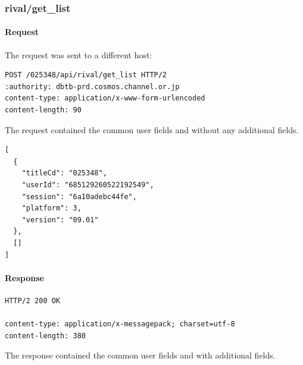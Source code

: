 

\subsubsection{rival/get\_list}
\label{subsec:api_rival_get_list}

\paragraph{Request}

The request was sent to a different host:

\begin{lstlisting}
POST /025348/api/rival/get_list HTTP/2
:authority: dbtb-prd.cosmos.channel.or.jp
content-type: application/x-www-form-urlencoded
content-length: 90
\end{lstlisting}

The request contained the common user fields and without any additional fields.

\begin{lstlisting}
[
  {
    "titleCd": "025348",
    "userId": "685129260522192549",
    "session": "6a10adebc44fe",
    "platform": 3,
    "version": "09.01"
  },
  []
]
\end{lstlisting}

\newpage

\paragraph{Response}

\begin{lstlisting}
HTTP/2 200 OK

content-type: application/x-messagepack; charset=utf-8
content-length: 380
\end{lstlisting}

The response contained the common user fields and with additional fields.

